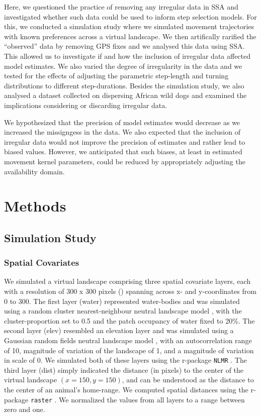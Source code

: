 \documentclass[abstract=on,10pt,a4paper,bibliography=totocnumbered]{article}
\begin{document}
Here, we questioned the practice of removing any irregular data in SSA and
investigated whether such data could be used to inform step selection models.
For this, we conducted a simulation study where we simulated movement
trajectories with known preferences across a virtual landscape. We then
artifically rarified the ``observed'' data by removing GPS fixes and we analysed
this data using SSA. This allowed us to investigate if and how the inclusion of
irregular data affected model estimates. We also varied the degree of
irregularity in the data and we tested for the effects of adjusting the
parametric step-length and turning distributions to different step-durations.
Besides the simulation study, we also analysed a dataset collected on dispersing
African wild dogs and examined the implications considering or discarding
irregular data.

We hypothesized that the precision of model estimates would decrease as we
increased the missigngess in the data. We also expected that the inclusion of
irregular data would not improve the precision of estimates and rather lead to
biased values. However, we anticipated that such biases, at least in estimated
movement kernel parameters, could be reduced by appropriately adjusting the
availability domain.

\section{Methods}
\subsection{Simulation Study}
\subsubsection{Spatial Covariates}
We simulated a virtual landscape comprising three spatial covariate layers, each
with a resolution of 300 x 300 pixels () spanning across x- and
y-coordinates from 0 to 300. The first layer (\textsf{water}) represented
water-bodies and was simulated using a random cluster nearest‐neighbour neutral
landscape model \citep{Saura.2000}, with the cluster-proportion set to 0.5 and
the patch occupancy of water fixed to 20\%. The second layer (\textsf{elev})
resembled an elevation layer and was simulated using a Gaussian random fields
neutral landscape model \citep{Schlather.2015}, with an autocorrelation range of
10, magnitude of variation of the landscape of 1, and a magnitude of variation
in scale of 0. We simulated both of these layers using the r-package {\tt NLMR}
\citep{Sciaini.2018}. The third layer (\textsf{dist}) simply indicated the
distance (in pixels) to the center of the virtual landscape \((x = 150, y =
150)\), and can be understood as the distance to the center of an animal's
home-range. We computed spatial distances using the r-package {\tt raster}
\citep{Hijmans.2022}. We normalized the values from all layers to a range
between zero and one.
\end{document}
